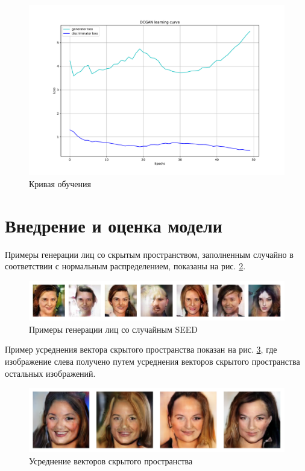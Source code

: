 \documentclass[60x84/16,8pt]{ittmm}
\begin{document}
\begin{figure}
  \centering
  \includegraphics[width=\linewidth]{learning_curve}
  \caption{Кривая обучения}
  \label{fig:learning-curve}
\end{figure}

\section{Внедрение и оценка модели}
\label{sec:base-section}

Примеры генерации лиц со скрытым пространством, заполненным случайно в соответствии с нормальным распределением,
показаны на рис. \ref{fig:result-random-seed}.

\begin{figure}
  \centering
  \includegraphics[width=\linewidth]{output}
  \caption{Примеры генерации лиц со случайным SEED}
  \label{fig:result-random-seed}
\end{figure}

Пример усреднения вектора скрытого пространства показан на рис. \ref{fig:interpolation}, где изображение слева
получено путем усреднения векторов скрытого пространства остальных изображений.

\begin{figure}
  \centering
  \includegraphics[width=0.8\linewidth]{interpolation}
  \caption{Усреднение векторов скрытого пространства}
  \label{fig:interpolation}
\end{figure}
\end{document}
